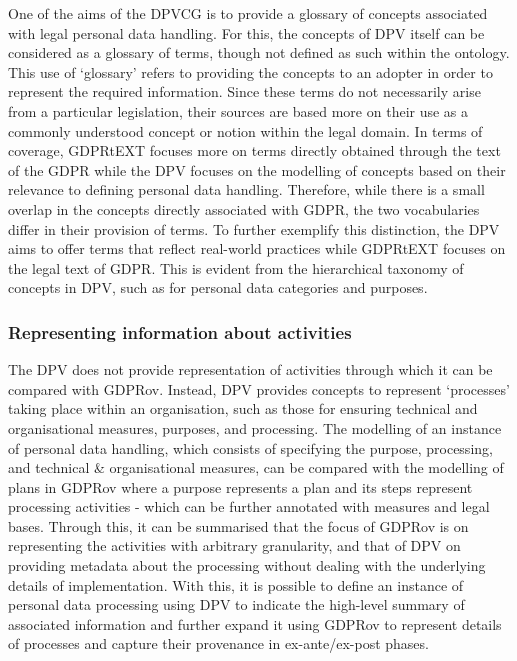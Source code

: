 One of the aims of the DPVCG is to provide a glossary of concepts associated with legal personal data handling. For this, the concepts of DPV itself can be considered as a glossary of terms, though not defined as such within the ontology. This use of `glossary' refers to providing the concepts to an adopter in order to represent the required information. Since these terms do not necessarily arise from a particular legislation, their sources are based more on their use as a commonly understood concept or notion within the legal domain.
In terms of coverage, GDPRtEXT focuses more on terms directly obtained through the text of the GDPR while the DPV focuses on the modelling of concepts based on their relevance to defining personal data handling.
Therefore, while there is a small overlap in the concepts directly associated with GDPR, the two vocabularies differ in their provision of terms. To further exemplify this distinction, the DPV aims to offer terms that reflect real-world practices while GDPRtEXT focuses on the legal text of GDPR. This is evident from the hierarchical taxonomy of concepts in DPV, such as for personal data categories and purposes.

\subsubsection{Representing information about activities}
The DPV does not provide representation of activities through which it can be compared with GDPRov.
Instead, DPV provides concepts to represent `processes' taking place within an organisation, such as those for ensuring technical and organisational measures, purposes, and processing.
The modelling of an instance of personal data handling, which consists of specifying the purpose, processing, and technical \& organisational measures, can be compared with the modelling of plans in GDPRov where a purpose represents a plan and its steps represent processing activities - which can be further annotated with measures and legal bases.
Through this, it can be summarised that the focus of GDPRov is on representing the activities with arbitrary granularity, and that of DPV on providing metadata about the processing without dealing with the underlying details of implementation. With this, it is possible to define an instance of personal data processing using DPV to indicate the high-level summary of associated information and further expand it using GDPRov to represent details of processes and capture their provenance in ex-ante/ex-post phases.

